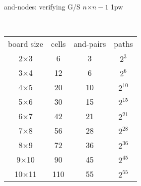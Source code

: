 \noindent
and-nodes: verifying G/S $n$$\times$$n-1$ 1pw

\ 

\begin{tabular}{cccc}
board size & cells & and-pairs & paths \\
2$\times$3 & 6 & 3 &  $2^3$\\
3$\times$4 & 12 & 6 & $2^6$\\
4$\times$5 & 20 & 10 & $2^{10}$ \\
5$\times$6 & 30 & 15 & $2^{15}$ \\
6$\times$7 & 42 & 21 & $2^{21}$ \\
7$\times$8 & 56 & 28 & $2^{28}$ \\
8$\times$9 & 72 & 36 & $2^{36}$ \\
9$\times$10 & 90 & 45 & $2^{45}$ \\
10$\times$11 & 110 & 55 & $2^{55}$ 
\end{tabular}
